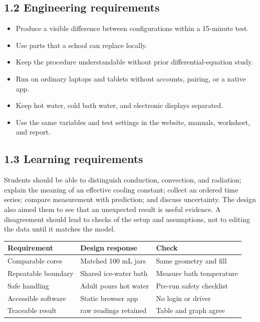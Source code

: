 \documentclass[10pt,conference,a4paper]{IEEEtran}
\begin{document}
\subsection*{1.2 Engineering requirements}

\begin{itemize}[leftmargin=*,nosep]

\item Produce a visible difference between configurations within a 15-minute test.

\item Use parts that a school can replace locally.

\item Keep the procedure understandable without prior differential-equation study.

\item Run on ordinary laptops and tablets without accounts, pairing, or a native app.

\item Keep hot water, cold bath water, and electronic displays separated.

\item Use the same variables and test settings in the website, manuals, worksheet, and report.

\end{itemize}

\subsection*{1.3 Learning requirements}

Students should be able to distinguish conduction, convection, and radiation; explain the meaning of an effective cooling constant; collect an ordered time series; compare measurement with prediction; and discuss uncertainty. The design also aimed them to see that an unexpected result is useful evidence. A disagreement should lead to checks of the setup and assumptions, not to editing the data until it matches the model.

\begin{center}\footnotesize
\setlength{\tabcolsep}{2.5pt}
\renewcommand{\arraystretch}{1.14}
\begin{tabular}{>{\raggedright\arraybackslash}p{}>{\raggedright\arraybackslash}p{}>{\raggedright\arraybackslash}p{}}
\toprule
\textbf{Requirement} & \textbf{Design response} & \textbf{Check} \\
\midrule
Comparable cores & Matched 100 mL jars & Same geometry and fill \\
Repeatable boundary & Shared ice-water bath & Measure bath temperature \\
Safe handling & Adult pours hot water & Pre-run safety checklist \\
Accessible software & Static browser app & No login or driver \\
Traceable result & 16 raw readings retained & Table and graph agree \\
\bottomrule
\end{tabular}
\end{center}
\end{document}

